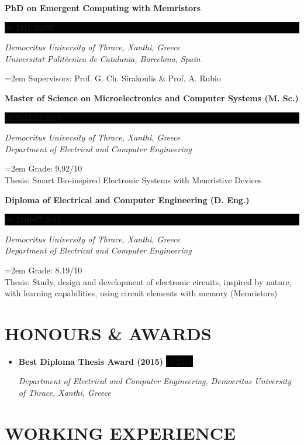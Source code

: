 \documentclass[paper=a4,fontsize=11pt]{scrartcl} %
\newcommand{\sepspace}{\vspace*{1em}}		%
\newcommand{\NewPart}[1]{\section*{\uppercase{#1}}}
\newcommand{\EducationEntry}[4]{
		\noindent \textbf{#1} \hfill      %
		\colorbox{Black}{%
			\parbox{6em}{%
			\hfill\color{White}#2}} \par  %
		\noindent \textit{#3} \par        %
		\noindent\hangindent=2em\hangafter=0 \small #4 %
		\normalsize \par}
\newcommand{\AwardEntry}[3]{
		\noindent \textbf{#1} \hfill      %
		\colorbox{Black}{\color{White}#2} \par  %
		\noindent \textit{#3} \par              %
		\normalsize \par}
\begin{document}
\EducationEntry{PhD on Emergent Computing with Memristors}{\footnotesize 09.2017-NOW}{Democritus University of Thrace, Xanthi, Greece \\ Universitat Polit\`ecnica de Catalunia, Barcelona, Spain}{Supervisors: Prof. G. Ch. Sirakoulis \& Prof. A. Rubio}
\EducationEntry{Master of Science on Microelectronics and Computer Systems (M. Sc.)}{\footnotesize 10.2015-03.2017}{Democritus University of Thrace, Xanthi, Greece \\ Department of Electrical and Computer Engineering}{Grade: 9.92/10\\Thesis: Smart Bio-inspired Electronic Systems with Memristive Devices}
\EducationEntry{Diploma of Electrical and Computer Engineering (D. Eng.)}{\footnotesize 09.2010-07.2015}{Democritus University of Thrace, Xanthi, Greece \\ Department of Electrical and Computer Engineering}{Grade: 8.19/10\\Thesis: Study, design and development of electronic circuits, inspired by nature, with learning capabilities, using circuit elements with memory (Memristors)}
\sepspace





\NewPart{Honours \& Awards}

\begin{itemize}[leftmargin=*]
    \item \AwardEntry{Best Diploma Thesis Award (2015)}{\footnotesize 03.2016}{Department of Electrical and Computer Engineering, Democritus University of Thrace, Xanthi, Greece}
\end{itemize}
\sepspace





\NewPart{Working Experience}
\end{document}
